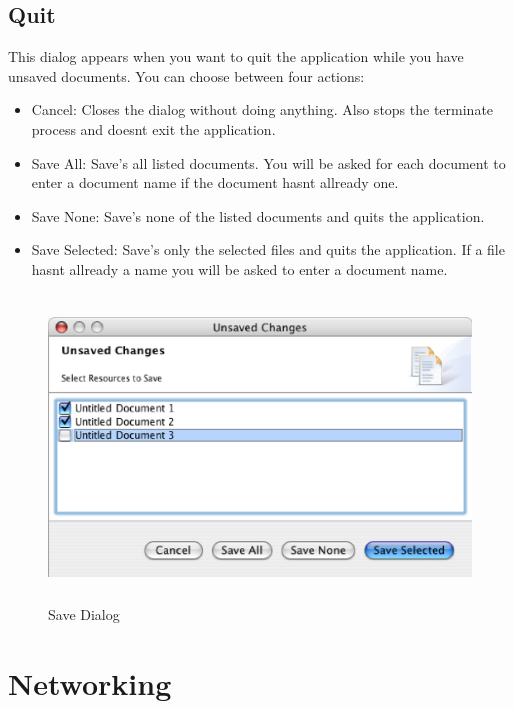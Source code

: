 \documentclass[11pt,a4paper]{article}
\begin{document}
\subsection{Quit}
This dialog appears when you want to quit the application while you have unsaved documents. You can choose between four actions:
\begin{itemize}
\item Cancel: Closes the dialog without doing anything. Also stops the terminate process and doesnt exit the application.
\item Save All: Save's all listed documents. You will be asked for each document to enter a document name if the document hasnt allready one.
\item Save None: Save's none of the listed documents and quits the application.
\item Save Selected: Save's only the selected files and quits the application. If a file hasnt allready a name you will be asked to enter a document name.
\end{itemize}

\begin{figure}[H]
\begin{center}
  \includegraphics[height=3.20in, width=5.22in]{../images/usermanual/ace_savedialog.eps}
\caption{Save Dialog}
\label{dialog_quit_save}
\end{center}
\end{figure}




\newpage
\section{Networking}
\label{sect_networking}
\end{document}
